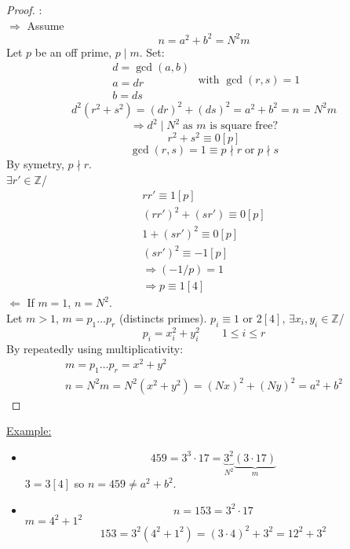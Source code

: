\documentclass{report}
\begin{document}
\begin{proof}:\\
			\underline{$\Rightarrow$} Assume \[n=a^2+b^2=N^2m\]
													Let $p$ be an off prime, $p\mid m$.
													Set: \[\begin{array}{lcl}
																				d=\gcd(a,b)\\
																				a=dr\\
																				b=ds
																	\end{array}\text{  with }\gcd(r,s)=1
																	\]
																	\[d^2(r^2+s^2)=(dr)^2+(ds)^2=a^2+b^2=n=N^2m\]
																	\[\Rightarrow d^2\mid N^2 \;\text{as }m\text{ is square free?}\]
																	\[r^2+s^2\equiv 0[p]\]
																	\[\gcd(r,s)=1\equiv p\nmid r \; \text{or} \; p\nmid s\]
																	By symetry, $p\nmid r$.\\
																	$\exists r' \in \mathbb{Z}$/ \[\begin{array}{lcl}
																																				rr'\equiv 1[p]\\
																																				(rr')^2+(sr')\equiv 0[p]\\
																																				1+(sr')^2\equiv 0[p]\\
																																				(sr')^2\equiv -1[p]\\
																																				\Rightarrow (-1/p)=1\\
																																				\Rightarrow p\equiv 1[4]
																																	\end{array}\]
			\underline{$\Leftarrow$} If $m=1$, $n=N^2$.\\
																Let $m>1$, $m=p_1\dots p_r$ (distincts primes).
																$p_i\equiv 1$ or $2 [4]$, $\exists x_i, y_i \in \mathbb{Z}$/
																\[p_i=x_i^2+y_i^2\qquad 1\leq i \leq r\]
																By repeatedly using multiplicativity:
																\[\begin{array}{lll}
																	m=p_1\dots p_r=x^2+y^2\\
																	n=N^2m=N^2(x^2+y^2)=(Nx)^2+(Ny)^2=a^2+b^2
																	\end{array}\]

\end{proof}


\underline{Example:}	\begin{itemize}
											\item \[459=3^3\cdot 17=\underbrace{3^2}_{N^2}\underbrace{(3\cdot 17)}_m\]
														$3=3[4]$ so $n=459\neq a^2+b^2$.
											\item \[n=153=3^2\cdot 17\]
														$m=4^2+1^2$\\
														\[153=3^2(4^2+1^2)=(3\cdot 4)^2+3^2=12^2+3^2\]
											\end{itemize}
																
\end{document}
